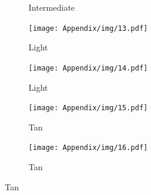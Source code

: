 \begin{appendices}
\begin{spacing}{1.5}
\begin{figure}[p]
\begin{subfigure}{.5\textwidth}
        \caption{Intermediate}
      \end{subfigure}
    \begin{subfigure}{.5\textwidth}
        \centering
        \texttt{[image: Appendix/img/13.pdf]}
        \caption{Light}
      \end{subfigure}%
      \begin{subfigure}{.5\textwidth}
        \centering
        \texttt{[image: Appendix/img/14.pdf]}
        \caption{Light}
      \end{subfigure}
    \begin{subfigure}{.5\textwidth}
        \centering
        \texttt{[image: Appendix/img/15.pdf]}
        \caption{Tan}
      \end{subfigure}%
      \begin{subfigure}{.5\textwidth}
        \centering
        \texttt{[image: Appendix/img/16.pdf]}
        \caption{Tan}
      \end{subfigure}
\end{figure}
\end{spacing}




\end{appendices}